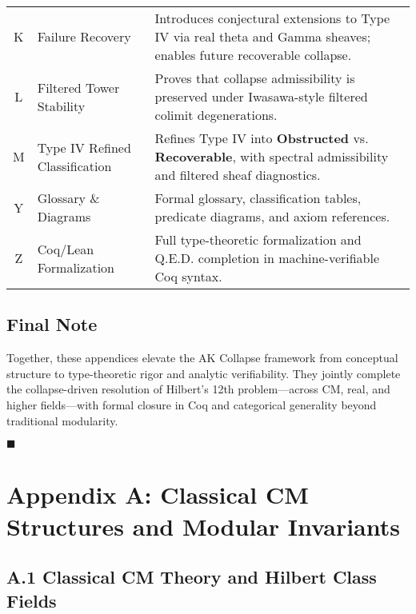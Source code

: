 \documentclass[11pt]{article}
\begin{document}
\begin{center}
\begin{tabular}{@{}cp{3.9cm}>{\raggedright\arraybackslash}p{11.8cm}@{}}
K & Failure Recovery & Introduces conjectural extensions to Type IV via real theta and Gamma sheaves; enables future recoverable collapse. \\
L & Filtered Tower Stability & Proves that collapse admissibility is preserved under Iwasawa-style filtered colimit degenerations. \\
M & Type IV Refined Classification & Refines Type IV into \textbf{Obstructed} vs. \textbf{Recoverable}, with spectral admissibility and filtered sheaf diagnostics. \\
Y & Glossary \& Diagrams & Formal glossary, classification tables, predicate diagrams, and axiom references. \\
Z & Coq/Lean Formalization & Full type-theoretic formalization and Q.E.D. completion in machine-verifiable Coq syntax. \\
\bottomrule
\end{tabular}
\end{center}

\vspace{1em}

\subsection*{Final Note}

Together, these appendices elevate the AK Collapse framework from conceptual structure to type-theoretic rigor and analytic verifiability.  
They jointly complete the collapse-driven resolution of Hilbert’s 12th problem—across CM, real, and higher fields—with formal closure in Coq and categorical generality beyond traditional modularity.

\hfill $\blacksquare$



\appendix
\section*{Appendix A: Classical CM Structures and Modular Invariants}

\subsection*{A.1 Classical CM Theory and Hilbert Class Fields}
\end{document}
